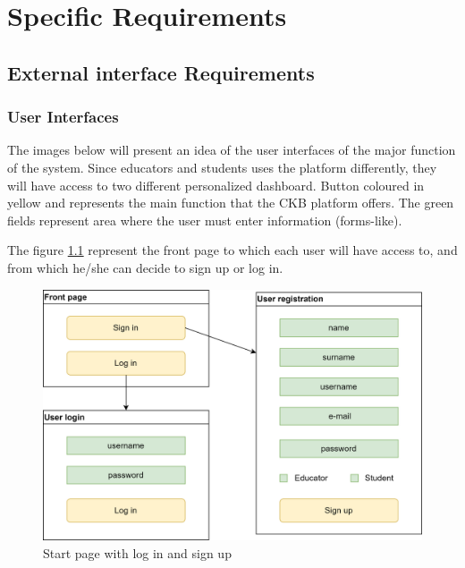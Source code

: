 \chapter{Specific Requirements}

\section{External interface Requirements}
\subsection{User Interfaces}
The images below will present an idea of the user interfaces of the major function of the system. Since educators and students uses the platform differently, they will have access to two different personalized dashboard. \newline
Button coloured in yellow and represents the main function that the CKB platform offers. The green fields represent area where the user must enter information (forms-like). \newline

The figure \ref{fig:login-signup} represent the front page to which each user will have access to, and from which he/she can decide to sign up or log in. 
    
\begin{figure}[h]
    \centering
    \includegraphics[scale=0.7]{images/login-signup.png}
    \caption{Start page with log in and sign up}
    \label{fig:login-signup}
\end{figure}

